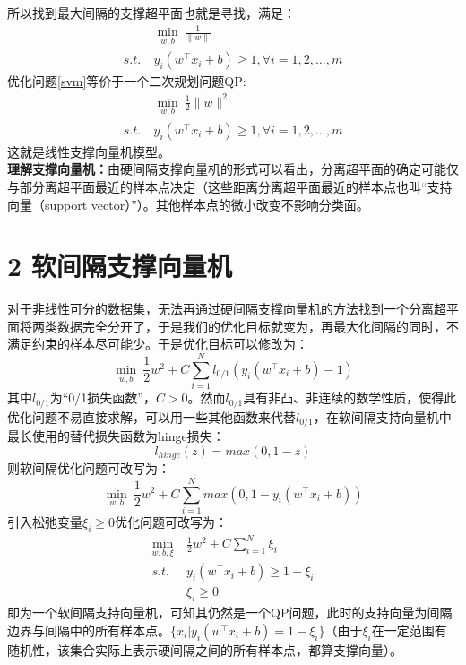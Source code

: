 \documentclass[twoside]{article}
\begin{document}
所以找到最大间隔的支撑超平面也就是寻找，满足：
\begin{equation*}
    \label{svm}
    \begin{aligned}
        &\underset{w,b}{\min}\ \frac{1}{\lVert w \rVert}\\
        s.t. \ & y_i\left(w^\top x_i+b\right)\ge 1,\forall i=1,2,\ldots,m
    \end{aligned}
\end{equation*}
优化问题\ref{svm}等价于一个二次规划问题QP:
\begin{equation*}
    \begin{aligned}
        &\underset{w,b}{\min}\ \frac{1}{2} \lVert w \rVert^2\\
        s.t. \ & y_i\left(w^\top x_i+b\right)\ge 1,\forall i=1,2,\ldots,m
    \end{aligned}
\end{equation*}
这就是线性支撑向量机模型。
\\
\textbf{理解支撑向量机：}由硬间隔支撑向量机的形式可以看出，分离超平面的确定可能仅与部分离超平面最近的样本点决定（这些距离分离超平面最近的样本点也叫“支持向量（support vector）”）。其他样本点的微小改变不影响分类面。
\section*{2 软间隔支撑向量机}
对于非线性可分的数据集，无法再通过硬间隔支撑向量机的方法找到一个分离超平面将两类数据完全分开了，于是我们的优化目标就变为，再最大化间隔的同时，不满足约束的样本尽可能少。于是优化目标可以修改为：
\begin{equation*}
    \underset{w,b}{\min}\ \frac{1}{2} w^2+C\sum_{i=1}^N l_{0/1}\left(y_i(w^\top x_i+b)-1\right)
\end{equation*}
其中$l_{0/1}$为“0/1损失函数”，$C>0$。然而$l_{0/1}$具有非凸、非连续的数学性质，使得此优化问题不易直接求解，可以用一些其他函数来代替$l_{0/1}$，在软间隔支持向量机中最长使用的替代损失函数为hinge损失：
\begin{equation*}
    l_{hinge}(z)=max(0,1-z)
\end{equation*}
则软间隔优化问题可改写为：
\begin{equation*}
    \underset{w,b}{\min}\ \frac{1}{2} w^2+C\sum_{i=1}^N max\left(0,1-y_i(w^\top x_i+b)\right)
\end{equation*}
引入松弛变量$\xi_i \ge 0 $优化问题可改写为：
\begin{equation*}
    \begin{aligned}
    \underset{w,b,\xi}{\min}\ &\frac{1}{2} w^2+C\sum_{i=1}^N \xi_i\\
    s.t.\  &y_i(w^\top x_i+b) \ge 1-\xi_i\\
    & \xi_i \ge 0
    \end{aligned}
\end{equation*}
即为一个软间隔支持向量机，可知其仍然是一个QP问题，此时的支持向量为间隔边界与间隔中的所有样本点。$\{x_i|y_i(w^\top x_i+b)=1-\xi_i\}$（由于$\xi_i$在一定范围有随机性，该集合实际上表示硬间隔之间的所有样本点，都算支撑向量）。
\end{document}
